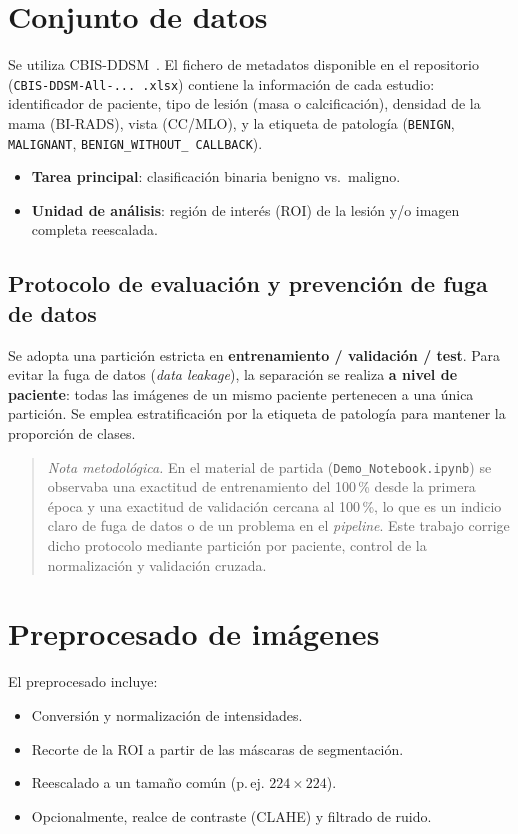 \section{Conjunto de datos}
Se utiliza \mbox{CBIS-DDSM}~\cite{lee2017cbisddsm}. El fichero de metadatos
disponible en el repositorio (\texttt{CBIS-DDSM-All-...\,.xlsx}) contiene la
información de cada estudio: identificador de paciente, tipo de lesión (masa o
calcificación), densidad de la mama (BI-RADS), vista (CC/MLO), y la etiqueta de
patología (\texttt{BENIGN}, \texttt{MALIGNANT}, \texttt{BENIGN\_WITHOUT\_
CALLBACK}).

\begin{itemize}
  \item \textbf{Tarea principal}: clasificación binaria benigno vs.\ maligno.
  \item \textbf{Unidad de análisis}: región de interés (ROI) de la lesión y/o
        imagen completa reescalada.
\end{itemize}

\subsection{Protocolo de evaluación y prevención de fuga de datos}
Se adopta una partición estricta en \textbf{entrenamiento / validación / test}.
Para evitar la fuga de datos (\textit{data leakage}), la separación se realiza
\textbf{a nivel de paciente}: todas las imágenes de un mismo paciente pertenecen
a una única partición. Se emplea estratificación por la etiqueta de patología
para mantener la proporción de clases.

\begin{quote}
\textit{Nota metodológica.} En el material de partida
(\texttt{Demo\_Notebook.ipynb}) se observaba una exactitud de entrenamiento del
100\,\% desde la primera época y una exactitud de validación cercana al 100\,\%,
lo que es un indicio claro de fuga de datos o de un problema en el
\textit{pipeline}. Este trabajo corrige dicho protocolo mediante partición por
paciente, control de la normalización y validación cruzada.
\end{quote}

\section{Preprocesado de imágenes}
El preprocesado incluye:
\begin{itemize}
  \item Conversión y normalización de intensidades.
  \item Recorte de la ROI a partir de las máscaras de segmentación.
  \item Reescalado a un tamaño común (p.\,ej. $224\times224$).
  \item Opcionalmente, realce de contraste (CLAHE) y filtrado de ruido.
\end{itemize}

